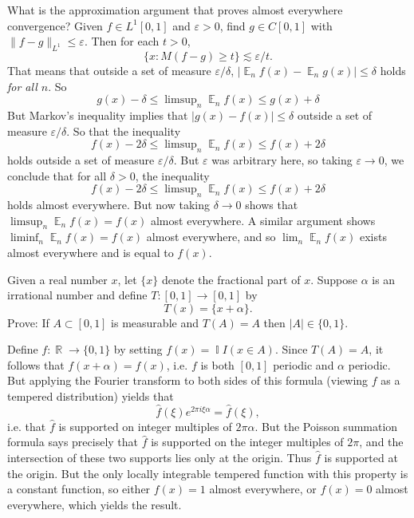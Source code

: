 \documentclass[answers]{exam}
\DeclareMathOperator{\RR}{\mathbb{R}}
\DeclareMathOperator{\EE}{\mathbb{E}}
\DeclareMathOperator{\II}{\mathbb{I}}
\begin{document}
\begin{questions}
\begin{parts}
\begin{solution}
		What is the approximation argument that proves almost everywhere convergence? Given $f \in L^1[0,1]$ and $\varepsilon > 0$, find $g \in C[0,1]$ with $\| f - g \|_{L^1} \leq \varepsilon$. Then for each $t > 0$,
		\[ \{ x : M(f - g) \geq t \} \lesssim \varepsilon / t. \]
		That means that outside a set of measure $\varepsilon / \delta$, $|\EE_n f(x) - \EE_n g(x)| \leq \delta$ holds \emph{for all $n$}. So
		\[ g(x) - \delta \leq \limsup\nolimits_n \EE_n f(x) \leq g(x) + \delta \]
		But Markov's inequality implies that $|g(x) - f(x)| \leq \delta$ outside a set of measure $\varepsilon / \delta$. So that the inequality 
		\[ f(x) - 2 \delta \leq \limsup\nolimits_n \EE_n f(x) \leq f(x) + 2\delta \]
		holds outside a set of measure $\varepsilon / \delta$. But $\varepsilon$ was arbitrary here, so taking $\varepsilon \to 0$, we conclude that for all $\delta > 0$, the inequality
		\[ f(x) - 2 \delta \leq \limsup\nolimits_n \EE_n f(x) \leq f(x) + 2\delta \]
		holds almost everywhere. But now taking $\delta \to 0$ shows that $\limsup\nolimits_n \EE_n f(x) = f(x)$ almost everywhere. A similar argument shows $\liminf_n \EE_n f(x) = f(x)$ almost everywhere, and so $\lim_n \EE_n f(x)$ exists almost everywhere and is equal to $f(x)$.
	\end{solution}
\end{parts}

\question Given a real number $x$, let $\{ x \}$ denote the fractional part of $x$. Suppose $\alpha$ is an irrational number and define $T: [0,1] \to [0,1]$ by
%
\[ T(x) = \{ x + \alpha \}. \]
%
Prove: If $A \subset [0,1]$ is measurable and $T(A) = A$ then $|A| \in \{ 0, 1 \}$.
\begin{solution}
	Define $f: \RR \to \{ 0, 1 \}$ by setting $f(x) = \II{I}(x \in A)$. Since $T(A) = A$, it follows that $f(x + \alpha) = f(x)$, i.e. $f$ is both $[0,1]$ periodic and $\alpha$ periodic. But applying the Fourier transform to both sides of this formula (viewing $f$ as a tempered distribution) yields that
	\[ \widehat{f}(\xi) e^{2 \pi i \xi \alpha} = \widehat{f}(\xi), \]
	i.e. that $\widehat{f}$ is supported on integer multiples of $2 \pi \alpha$. But the Poisson summation formula says precisely that $\widehat{f}$ is supported on the integer multiples of $2 \pi$, and the intersection of these two supports lies only at the origin. Thus $\widehat{f}$ is supported at the origin. But the only locally integrable tempered function with this property is a constant function, so either $f(x) = 1$ almost everywhere, or $f(x) = 0$ almost everywhere, which yields the result.


\end{solution}
\end{questions}
\end{document}
